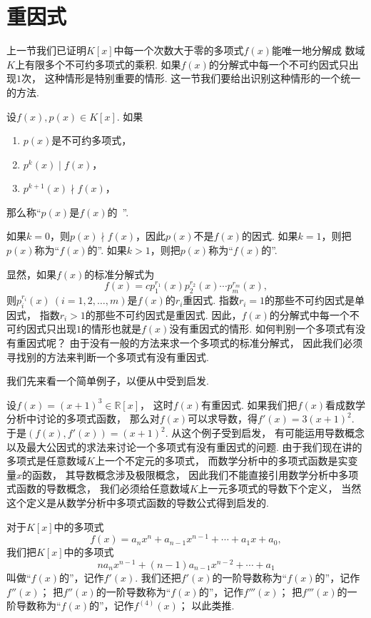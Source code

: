 \section{重因式}
上一节我们已证明\(K[x]\)中每一个次数大于零的多项式\(f(x)\)能唯一地分解成
数域\(K\)上有限多个不可约多项式的乘积.
如果\(f(x)\)的分解式中每一个不可约因式只出现\(1\)次，
这种情形是特别重要的情形.
这一节我们要给出识别这种情形的一个统一的方法.

\begin{definition}
设\(f(x),p(x) \in K[x]\).
如果\begin{enumerate}
	\item \(p(x)\)是不可约多项式，
	\item \(p^k(x) \mid f(x)\)，
	\item \(p^{k+1}(x) \nmid f(x)\)，
\end{enumerate}
那么称“\(p(x)\)是\(f(x)\)的~”.

如果\(k=0\)，则\(p(x) \nmid f(x)\)，因此\(p(x)\)不是\(f(x)\)的因式.
如果\(k=1\)，则把\(p(x)\)称为“\(f(x)\)的”.
如果\(k>1\)，则把\(p(x)\)称为“\(f(x)\)的”.
\end{definition}

显然，如果\(f(x)\)的标准分解式为\[
	f(x) = c p_1^{r_1}(x) p_2^{r_2}(x) \dotsm p_m^{r_m}(x),
\]
则\(p_i^{r_i}(x)\ (i=1,2,\dotsc,m)\)是\(f(x)\)的\(r_i\)重因式.
指数\(r_i = 1\)的那些不可约因式是单因式，
指数\(r_i > 1\)的那些不可约因式是重因式.
因此，\(f(x)\)的分解式中每一个不可约因式只出现\(1\)的情形也就是\(f(x)\)没有重因式的情形.
如何判别一个多项式有没有重因式呢？
由于没有一般的方法来求一个多项式的标准分解式，
因此我们必须寻找别的方法来判断一个多项式有没有重因式.

我们先来看一个简单例子，以便从中受到启发.

设\(f(x) = (x+1)^3 \in \mathbb{R}[x]\)，
这时\(f(x)\)有重因式.
如果我们把\(f(x)\)看成数学分析中讨论的多项式函数，
那么对\(f(x)\)可以求导数，得\(f'(x) = 3(x+1)^2\).
于是\((f(x),f'(x)) = (x+1)^2\).
从这个例子受到启发，
有可能运用导数概念以及最大公因式的求法来讨论一个多项式有没有重因式的问题.
由于我们现在讲的多项式是任意数域\(K\)上一个不定元的多项式，
而数学分析中的多项式函数是实变量\(x\)的函数，
其导数概念涉及极限概念，
因此我们不能直接引用数学分析中多项式函数的导数概念，
我们必须给任意数域\(K\)上一元多项式的导数下个定义，
当然这个定义是从数学分析中多项式函数的导数公式得到启发的.

\begin{definition}\label{definition:多项式.导数}
对于\(K[x]\)中的多项式\[
	f(x) = a_n x^n + a_{n-1} x^{n-1} + \dotsb + a_1 x + a_0,
\]
我们把\(K[x]\)中的多项式\[
	n a_n x^{n-1} + (n-1) a_{n-1} x^{n-2} + \dotsb + a_1
\]
叫做“\(f(x)\)的”，记作\(f'(x)\).
我们还把\(f'(x)\)的一阶导数称为“\(f(x)\)的”，记作\(f''(x)\)；
把\(f''(x)\)的一阶导数称为“\(f(x)\)的”，记作\(f'''(x)\)；
把\(f'''(x)\)的一阶导数称为“\(f(x)\)的”，记作\(f^{(4)}(x)\)；
以此类推.
\end{definition}

